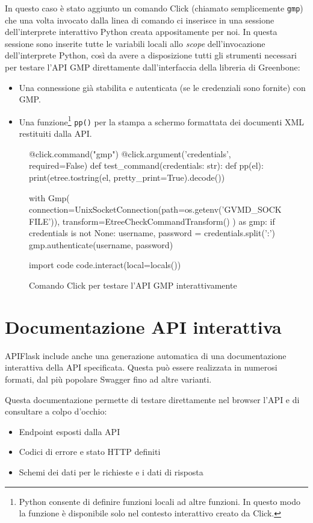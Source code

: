 In questo caso è stato aggiunto un comando Click (chiamato semplicemente \texttt{gmp}) che una volta invocato dalla linea di comando ci inserisce in una sessione dell'interprete interattivo Python creata appositamente per noi. In questa sessione sono inserite tutte le variabili locali allo \emph{scope} dell'invocazione dell'interprete Python, così da avere a disposizione tutti gli strumenti necessari per testare l'API GMP direttamente dall'interfaccia della libreria di Greenbone:
\begin{itemize}
    \item Una connessione già stabilita e autenticata (se le credenziali sono fornite) con GMP.
    \item Una funzione\footnote{Python consente di definire funzioni locali ad altre funzioni. In questo modo la funzione è disponibile solo nel contesto interattivo creato da Click.} \texttt{pp()} per la stampa a schermo formattata dei documenti XML restituiti dalla API.
\end{itemize}

\begin{figure}
\begin{pycode}
@click.command("gmp")
@click.argument('credentials', required=False)
def test_command(credentials: str):
    def pp(el):
        print(etree.tostring(el, pretty_print=True).decode())

    with Gmp(
        connection=UnixSocketConnection(path=os.getenv('GVMD_SOCKFILE')),
        transform=EtreeCheckCommandTransform()
    ) as gmp:
        if credentials is not None:
            username, password = credentials.split(':')
            gmp.authenticate(username, password)

        import code
        code.interact(local=locals())
\end{pycode}
\caption{Comando Click per testare l'API GMP interattivamente}
\end{figure}

\section{Documentazione API interattiva}
APIFlask include anche una generazione automatica di una documentazione interattiva della API specificata. Questa può essere realizzata in numerosi formati, dal più popolare Swagger fino ad altre varianti.

Questa documentazione permette di testare direttamente nel browser l'API e di consultare a colpo d'occhio:
\begin{itemize}
    \item Endpoint esposti dalla API
    \item Codici di errore e stato HTTP definiti
    \item Schemi dei dati per le richieste e i dati di risposta
\end{itemize}

